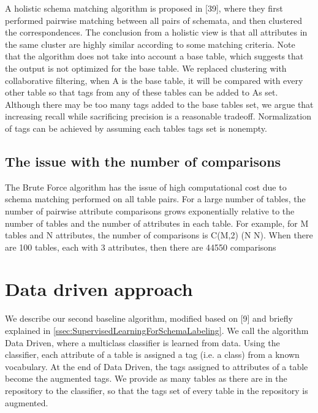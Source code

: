 A holistic schema matching algorithm is proposed in \cite{Rahm2016Case}[39], where they first performed pairwise matching between all pairs of schemata, and then clustered the correspondences. The conclusion from a holistic view is that all attributes in the same cluster are highly similar according to some matching criteria. Note that the algorithm does not take into account a base table, which suggests that the output is not optimized for the base table. We replaced clustering with collaborative filtering, when A is the base table, it will be compared with every other table so that tags from any of these tables can be added to As set. Although there may be too many tags added to the base tables set, we argue that increasing recall while sacrificing precision is a reasonable tradeoff. Normalization of tags can be achieved by assuming each tables tags set is nonempty.

\subsection{The issue with the number of comparisons}

The Brute Force algorithm has the issue of high computational cost due to schema matching performed on all table pairs. For a large number of tables, the number of pairwise attribute comparisons grows exponentially relative to the number of tables and the number of attributes in each table. For example, for M tables and N attributes, the number of comparisons is C(M,2)  (N  N). When there are 100 tables, each with 3 attributes, then there are 44550 comparisons

\section{Data driven approach}
\label{sec:DataDrivenApproach}

We describe our second baseline algorithm, modified based on \cite{10.1145/3184558.3191601}[9] and briefly explained in \autoref{ssec:SupervisedLearningForSchemaLabeling}. We call the algorithm Data Driven, where a multiclass classifier is learned from data. Using the classifier, each attribute of a table is assigned a tag (i.e. a class) from a known vocabulary. At the end of Data Driven, the tags assigned to attributes of a table become the augmented tags. We provide as many tables as there are in the repository to the classifier, so that the tags set of every table in the repository is augmented.

